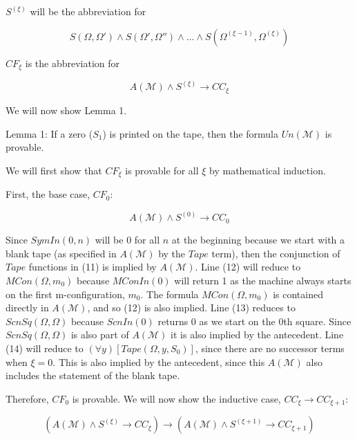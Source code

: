 \documentclass[11pt]{article}
\newcommand{\?}{\stackrel{?}{=}}
\begin{document}
$S^{(\xi)}$ will be the abbreviation for

$$S(\Omega,\Omega') \land S(\Omega',\Omega'') \land \dots \land S(\Omega^{(\xi-1)},\Omega^{(\xi)})$$

$CF_\xi$ is the abbreviation for

$$A(\mathscr{M}) \land S^{(\xi)} \to CC_\xi$$

We will now show Lemma 1.

Lemma 1: If a zero ($S_1$) is printed on the tape, then the formula $Un(\mathscr{M})$ is provable.

We will first show that $CF_\xi$ is provable for all $\xi$ by mathematical induction.

First, the base case, $CF_0$:

$$A(\mathscr{M}) \land S^{(0)} \to CC_0$$

Since $SymIn(0, n)$ will be 0 for all $n$ at the beginning because we start with a blank tape (as specified in $A(\mathscr{M})$ by the $Tape$ term), then the conjunction of $Tape$ functions in (11) is implied by $A(\mathscr{M})$. Line (12) will reduce to $MCon(\Omega, m_0)$ because $MConIn(0)$ will return 1 as the machine always starts on the first m-configuration, $m_0$. The formula $MCon(\Omega, m_0)$ is contained directly in $A(\mathscr{M})$, and so (12) is also implied. Line (13) reduces to $ScnSq(\Omega, \Omega)$ because $ScnIn(0)$ returns 0 as we start on the 0th square. Since $ScnSq(\Omega, \Omega)$ is also part of $A(\mathscr{M})$ it is also implied by the antecedent. Line (14) will reduce to $(\forall y)[Tape(\Omega,y,S_0)]$, since there are no successor terms when $\xi=0$. This is also implied by the antecedent, since this $A(\mathscr{M})$ also includes the statement of the blank tape.

Therefore, $CF_0$ is provable. We will now show the inductive case, $CC_\xi \to CC_{\xi + 1}$:

$$(A(\mathscr{M}) \land S^{(\xi)} \to CC_\xi) \to (A(\mathscr{M}) \land S^{(\xi + 1)} \to CC_{\xi + 1})$$
\end{document}
